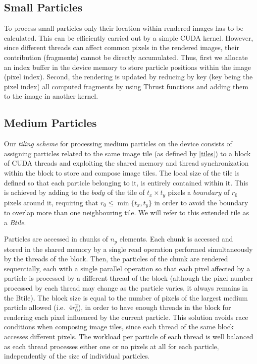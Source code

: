 \documentclass[preprint,5pt]{elsarticle}
\begin{document}
\subsection{Small Particles}
\label{sec:smallparticles}
To process small particles only their location within rendered images has to be calculated. This can be efficiently carried out by a simple CUDA kernel. However, since different threads can affect common pixels in the rendered images, their contribution (fragments) cannot be directly accumulated. Thus, first we allocate an index buffer in the device memory to store particle positions within the image (pixel index). Second, the rendering is updated by reducing by key (key being the pixel index) all computed fragments by using Thrust functions and adding them to the image in another kernel.

\subsection{Medium Particles}
\label{sec:mediumparticles}
Our \textit{tiling scheme} for processing medium particles on the device consists of assigning particles related to the same image tile (as defined by \eqref{tiles}) to a block of CUDA threads and exploiting  the shared memory and thread synchronization within the block to store and compose image tiles. The local size of the tile is defined so that each particle belonging to it, is entirely contained within it. This is achieved by adding to the $body$ of the tile of $t_x \times t_y$ pixels a $boundary$ of $r_0$ pixels around it, requiring that $r_0 \le \min\{t_x, t_y\}$ in order to avoid the boundary to overlap more than one neighbouring tile. We will refer to this extended tile as a \textit{Btile}.

Particles are accessed in chunks of $n_p$ elements. Each chunk is accessed and stored in the shared memory by a single read operation performed simultaneously by the threads of the block. Then, the particles of the chunk are rendered sequentially, each with a single parallel operation so that each pixel affected by a particle is processed by a different thread of the block (although the pixel number processed by each thread may change as the particle varies, it always remains in the Btile). The block size is equal to the number of pixels of the largest medium particle allowed (i.e.~$4r_0^2$), in order to have enough threads in the block for rendering each pixel influenced by the current particle. 
This solution avoids race conditions when composing image tiles, since each
thread of the same block accesses different pixels. The workload per particle of each
thread is well balanced as each thread processes either one or no pixels at all for each particle, independently of the size of individual particles.
\end{document}
